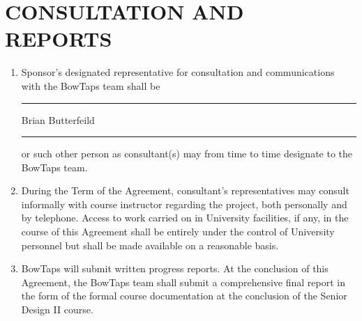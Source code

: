 \documentclass[11pt]{article}
\begin{document}
\section{CONSULTATION AND REPORTS}     
\begin{enumerate}  \itemsep4pt \parskip0pt 
\item  Sponsor's designated representative for consultation and       communications with the BowTaps team shall be \\[3mm]  \rule{2cm}{0.4pt} Brian Butterfeild \rule{2cm}{0.4pt}   or such other person as consultant(s)       may from time to time designate to the BowTaps team.    

\item During the Term of the Agreement, consultant's representatives may       consult informally with course instructor regarding the       project, both personally and by telephone. Access to work carried       on in University facilities, if any, in the course of this Agreement shall       be entirely under the control of University personnel but shall be       made available on a reasonable basis.    

\item BowTaps will submit written progress reports. At the conclusion of this Agreement, the BowTaps team shall submit a comprehensive final report in the form of the formal course documentation at the conclusion of the Senior Design II course. 
\end{enumerate}
\end{document}
